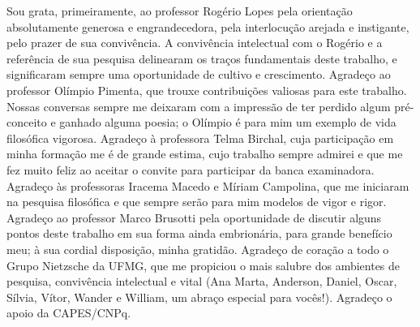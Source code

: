 \documentclass[
	12pt,				%
	openright,			%
	oneside,			%
	a4paper,			%
	english,			%
	french,				%
	spanish,			%
	brazil				%
	]{abntex2}
\begin{document}

\begin{agradecimentos}
Sou grata, primeiramente, ao professor Rogério Lopes pela orientação absolutamente generosa e engrandecedora, pela interlocução arejada e instigante, pelo prazer de sua convivência. A convivência intelectual com o Rogério e a referência de sua pesquisa delinearam os traços fundamentais deste trabalho, e significaram sempre uma oportunidade de cultivo e crescimento. Agradeço ao professor Olímpio Pimenta, que trouxe contribuições valiosas para este trabalho. Nossas conversas sempre me deixaram com a impressão de ter perdido algum pré-conceito e ganhado alguma poesia; o Olímpio é para mim um exemplo de vida filosófica vigorosa. Agradeço à professora Telma Birchal, cuja participação em minha formação me é de grande estima, cujo trabalho sempre admirei e que me fez muito feliz ao aceitar o convite para participar da banca examinadora. Agradeço às professoras Iracema Macedo e Míriam Campolina, que me iniciaram na pesquisa filosófica e que sempre serão para mim modelos de vigor e rigor. Agradeço ao professor Marco Brusotti pela oportunidade de discutir alguns pontos deste trabalho em sua forma ainda embrionária, para grande benefício meu; à sua cordial disposição, minha gratidão. Agradeço de coração a todo o Grupo Nietzsche da UFMG, que me propiciou o mais salubre dos ambientes de pesquisa, convivência intelectual e vital (Ana Marta, Anderson, Daniel, Oscar, Sílvia, Vítor, Wander e William, um abraço especial para vocês!).  Agradeço o apoio da CAPES/CNPq. 


\end{agradecimentos}
\end{document}
